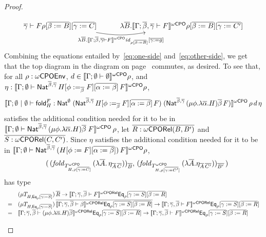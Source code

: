 \documentclass[acmsmall,review,anonymous]{acmart}
\theoremstyle{definition}
\renewcommand{\id}{\mathit{id}}
\begin{document}
\begin{proof}
\begin{itemize}
{\begin{equation}
\begin{tikzcd}[row sep = huge]
{  \ol{\gamma} \vdash F} \rho [\ol{\beta := B}] [\ol{\gamma := C}]
\ar[r, bend right = 10, "{\lambda \ol{B}.\oCPOsem{\Gamma; \ol{\beta}, \ol{\gamma}
      \vdash F} \id_{\rho [\ol{\beta := B}]} [\ol{\gamma := g}]}"'] &
\lambda \ol{B}.\oCPOsem{\Gamma; \ol{\beta}, \ol{\gamma} \vdash F} \rho [\ol{\beta :=
    B}] [\ol{\gamma := C'}]
\end{tikzcd}
\end{equation}}
Combining the equations entailed by~\ref{eq:one-side}
and~\ref{eq:other-side}, we get that
the top diagram in the diagram on
  page~\pageref{page:dia1} commutes, as desired.
To see that, for all $\rho : \omega\mathsf{CPOEnv}$, $d \in
\llbracket{\Gamma; \emptyset \vdash \emptyset}\rrbracket^{{\omega\mathsf{CPO}}}\rho$, and $\eta :
\llbracket{\Gamma; \emptyset \vdash \mathsf{Nat}^{\overline{\beta},
    \overline{\gamma}}\,H[\phi :=_{\overline{\beta}} F][\overline{\alpha := \beta}]\,F}\rrbracket^{{\omega\mathsf{CPO}}}
\rho$,
\[\llbracket{\Gamma; \emptyset~|~\emptyset
  \vdash \mathsf{fold}^F_H : \mathsf{Nat}^\emptyset\;(\mathsf{Nat}^{\overline{\beta},
    \overline{\gamma}}\,H[\phi :=_{\overline{\beta}} F][\overline{\alpha :=
      \beta}]\,F)\; (\mathsf{Nat}^{{\overline{\beta},\overline{\gamma}} }\,(\mu
  \phi.\lambda \overline \alpha.H)\overline \beta\,F)}\rrbracket^{{\omega\mathsf{CPO}}}\,\rho\,d\,\eta\]
satisfies the additional condition needed for it to be in
$\llbracket{\Gamma;\emptyset \vdash \mathsf{Nat}^{{\overline{\beta},\overline{\gamma}}
  }\,(\mu \phi.\lambda \overline \alpha.H)\overline \beta\;F}\rrbracket^{{\omega\mathsf{CPO}}}\,\rho$,
let $\overline{R : {\omega\mathsf{CPORel}}(B,B')}$ and $\overline{S : {\omega\mathsf{CPORel}}(C,C')}$.  Since $\eta$
satisfies the additional condition needed for it to be in
$\llbracket{\Gamma; \emptyset \vdash \mathsf{Nat}^{\overline{\beta},
    \overline{\gamma}}\,(H[\phi := F][\overline{\alpha := \beta}])\,F}\rrbracket^{{\omega\mathsf{CPO}}} \rho$,
\[\begin{array}{ll}
 & (\,(\mathit{fold}_{T^{\omega\mathsf{CPO}}_{H,\rho[\overline{\gamma :=
        C}]}}\,(\lambda \overline{A}.\,\eta_{\overline{A}\,\overline{C}}))_{\overline{B}},\,
(\mathit{fold}_{T^{\omega\mathsf{CPO}}_{H,\rho[\overline{\gamma :=
        C'}]}}\,(\lambda \overline{A}.\eta_{\overline{A}\,\overline{C'}}))_{\overline{B'}}\,) 
\end{array}\]
has type
\[\begin{array}{ll}
  & (\mu T_{H,\mathsf{Eq}_\rho[\overline{\gamma := S}]}) \,\overline{R} \to
\llbracket{\Gamma;\overline{\gamma},\overline{\beta} \vdash F}\rrbracket^{{\omega\mathsf{CPORel}}}\mathsf{Eq}_\rho[\overline{\gamma := 
    S}][\overline{\beta:= R}]\\ 
= & (\mu T_{H,\mathsf{Eq}_\rho[\overline{\gamma :=
      S}]})\,\overline{\llbracket{\Gamma;\overline{\gamma},\overline{\beta} 
  \vdash \beta}\rrbracket^{{\omega\mathsf{CPORel}}}\mathsf{Eq}_\rho[\overline{\gamma := S}][\overline{\beta := R}]} \to
\llbracket{\Gamma;\overline{\gamma},\overline{\beta} \vdash F}\rrbracket^{{\omega\mathsf{CPORel}}}\mathsf{Eq}_\rho[\overline{\gamma := 
    S}][\overline{\beta:= R}]\\ 
= & \llbracket{\Gamma; \overline{\gamma},\overline{\beta} \vdash (\mu \phi. \lambda
  \overline{\alpha}. H)\overline{\beta}}\rrbracket^{{\omega\mathsf{CPORel}}}\mathsf{Eq}_\rho[\overline{\gamma := S}][\overline{\beta := R}] \to
\llbracket{\Gamma;\overline{\gamma},\overline{\beta} \vdash F}\rrbracket^{{\omega\mathsf{CPORel}}}\mathsf{Eq}_\rho[\overline{\gamma := 
    S}][\overline{\beta:= R}]
\qedhere
\end{array}\]


\end{itemize}
\end{proof}
\end{document}
